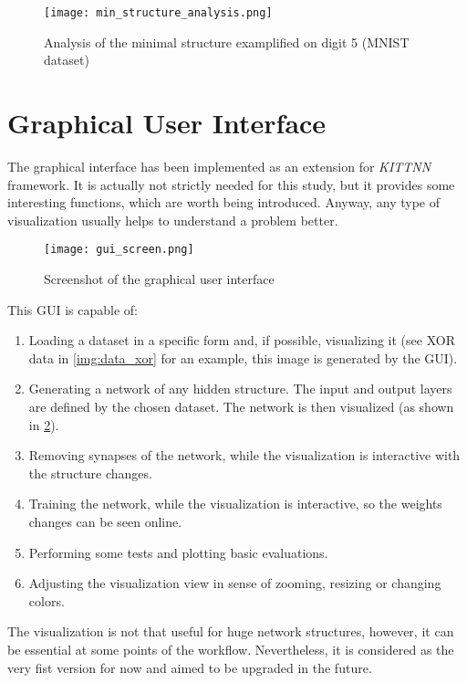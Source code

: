 \begin{figure}[H]
  \centering
  \texttt{[image: min\_structure\_analysis.png]}
  \caption{Analysis of the minimal structure examplified on digit 5 (MNIST dataset)}
  \label{img:structure_util}
\end{figure}

\section{Graphical User Interface} \label{sec:gui}
The graphical interface has been implemented as an extension for \textit{KITTNN} framework. It is actually not strictly needed for this study, but it provides some interesting functions, which are worth being introduced. Anyway, any type of visualization usually helps to understand a problem better.

\begin{figure}[H]
  \centering
  \texttt{[image: gui\_screen.png]}
  \caption{Screenshot of the graphical user interface}
  \label{img:gui_screen}
\end{figure}

This GUI is capable of:
\begin{enumerate}
\item Loading a dataset in a specific form and, if possible, visualizing it (see XOR data in \cref{img:data_xor} for an example, this image is generated by the GUI).
\item Generating a network of any hidden structure. The input and output layers are defined by the chosen dataset. The network is then visualized (as shown in \cref{img:gui_screen}).
\item Removing synapses of the network, while the visualization is interactive with the structure changes.
\item Training the network, while the visualization is interactive, so the weights changes can be seen online.
\item Performing some tests and plotting basic evaluations.
\item Adjusting the visualization view in sense of zooming, resizing or changing colors.
\end{enumerate}

The visualization is not that useful for huge network structures, however, it can be essential at some points of the workflow. Nevertheless, it is considered as the very fist version for now and aimed to be upgraded in the future.